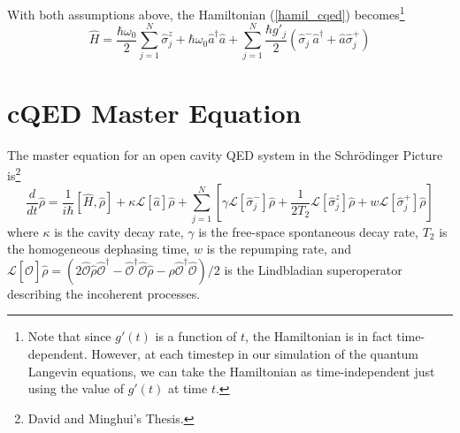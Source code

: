 \documentclass{article}
\newcommand{\lindblad}{\mathcal{L}}
\newcommand{\ope}{\hat{\mathcal{O}}}
\newcommand{\szj}{\hat{\sigma}^z_j}
\newcommand{\spj}{\hat{\sigma}^+_j}
\newcommand{\smj}{\hat{\sigma}^-_j}
\begin{document}
With both assumptions above, the Hamiltonian (\ref{hamil_cqed}) becomes\footnote{Note that since $g'(t)$ is a function of $t$, the Hamiltonian is in fact time-dependent. However, at each timestep in our simulation of the quantum Langevin equations, we can take the Hamiltonian as time-independent just using the value of $g'(t)$ at time $t$.} 
\begin{equation}
\label{hamil_beamLaser}
    \hat{H} = \frac{\hbar \omega_0}{2}\sum^{N}_{j=1}\szj+\hbar \omega_0 \hat{a}^\dagger \hat{a}+\sum^{N}_{j=1}\frac{\hbar g'_j}{2}\left(\smj \hat{a}^\dagger+\hat{a}\spj\right)
\end{equation}







\section{cQED Master Equation}
The master equation for an open cavity QED system in the Schrödinger Picture is\footnote{David and Minghui's Thesis.}
\begin{equation}
\label{master_cqed}
\frac{d}{dt}\hat{\rho}=\frac{1}{i\hbar}\left[\hat{H},\hat{\rho}\right]+\kappa\lindblad[\hat{a}]\hat{\rho}+\sum^{N}_{j=1}\left[\gamma \lindblad[\hat{\sigma}^{-}_j]\hat{\rho}+\frac{1}{2T_2}\lindblad[\hat{\sigma}^{z}_j]\hat{\rho}+w\lindblad[\hat{\sigma}^{+}_j ]\hat{\rho}\right]
\end{equation}
where $\kappa$ is the cavity decay rate, $\gamma$ is the free-space spontaneous decay rate, $T_2$ is the homogeneous dephasing time, $w$ is the repumping rate, and $\lindblad[\ope]\hat{\rho} = (2\ope\hat{\rho}\ope^\dagger-\ope^\dagger\ope\hat{\rho}-\rho\ope^\dagger\ope)/2$ is the Lindbladian superoperator describing the incoherent processes.
\end{document}

